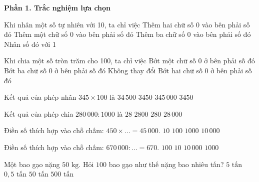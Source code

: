 \textbf{Phần 1. Trắc nghiệm lựa chọn}

\begin{ex} %
Khi nhân một số tự nhiên với 10, ta chỉ việc
\choice
{Thêm hai chữ số 0 vào bên phải số đó}
{\True Thêm một chữ số 0 vào bên phải số đó}
{Thêm ba chữ số 0 vào bên phải số đó}
{Nhân số đó với 1}
\end{ex}

\begin{ex} %
Khi chia một số tròn trăm cho 100, ta chỉ việc
\choice
{Bớt một chữ số 0 ở bên phải số đó}
{Bớt ba chữ số 0 ở bên phải số đó}
{Không thay đổi}
{\True Bớt hai chữ số 0 ở bên phải số đó}
\end{ex}

\begin{ex} %
Kết quả của phép nhân $345 \times 100$ là
\choice
{\True $34\,500$}
{$3450$}
{$345\,000$}
{$3450$}
\end{ex}

\begin{ex} %
Kết quả của phép chia $280\,000 : 1000$ là
\choice
{$28$}
{$2800$}
{\True $280$}
{$28\,000$}
\end{ex}

\begin{ex} %
Điền số thích hợp vào chỗ chấm: $450 \times \dots = 45\,000$.
\choice
{$10$}
{\True $100$}
{$1000$}
{$10\,000$}
\end{ex}

\begin{ex} %
Điền số thích hợp vào chỗ chấm: $670\,000 : \dots = 670$.
\choice
{$100$}
{$10$}
{$10\,000$}
{\True $1000$}
\end{ex}

\begin{ex} %
Một bao gạo nặng $50\text{ kg}$. Hỏi $100$ bao gạo như thế nặng bao nhiêu tấn?
\choice
{\True $5\text{ tấn}$}
{$0{,}5\text{ tấn}$}
{$50\text{ tấn}$}
{$500\text{ tấn}$}
\end{ex}

